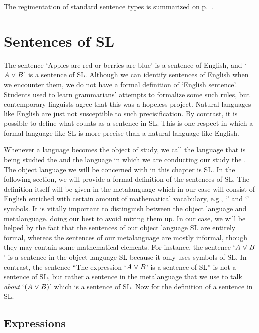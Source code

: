 The regimentation of standard sentence types is summarized on p.~\pageref{app.notation}.





\section{Sentences of SL}
\label{sec:sentencesofSL}
The sentence `Apples are red or berries are blue' is a sentence of English, and `$A\mkern1mu\vee\mkern1mu B$' is a sentence of SL.
Although we can identify sentences of English when we encounter them, we do not have a formal definition of `English sentence'.
Students used to learn grammarians' attempts to formalize some such rules, but contemporary linguists agree that this was a hopeless project.
Natural languages like English are just not susceptible to such precisification.
By contrast, it is possible to define what counts as a sentence in SL.
This is one respect in which a formal language like SL is more precise than a natural language like English.

Whenever a language becomes the object of study, we call the language that is being studied the  and the language in which we are conducting our study the . \label{def.metalanguage}
The object language we will be concerned with in this chapter is SL.
In the following section, we will provide a formal definition of the sentences of SL. 
The definition itself will be given in the metalanguage which in our case will consist of English enriched with certain amount of mathematical vocabulary, e.g., `\metaA{}' and `\metaB{}' symbols.
It is vitally important to distinguish between the object language and metalanguage, doing our best to avoid mixing them up.
In our case, we will be helped by the fact that the sentences of our object language SL are entirely formal, whereas the sentences of our metalanguage are mostly informal, though they may contain some mathematical elements.
For instance, the sentence `$A\mkern1mu\vee\mkern1mu B$' is a sentence in the object language SL because it only uses symbols of SL. 
In contrast, the sentence ``The expression `$A\mkern1mu\vee\mkern1mu B$' is a sentence of SL'' is not a sentence of SL, but rather a sentence in the metalanguage that we use to talk \emph{about} `$(A\mkern1mu\vee\mkern1mu B)$' which is a sentence of SL.
Now for the definition of a sentence in SL.


\subsection{Expressions}

